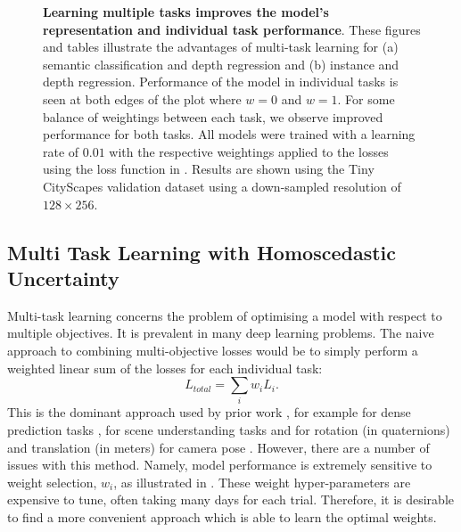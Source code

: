 {\begin{landscape}
\begin{figure}[t]
   \caption[Effect of loss weighting in multi-task learning.]{\textbf{Learning multiple tasks improves the model's representation and individual task performance}. These figures and tables illustrate the advantages of multi-task learning for (a) semantic classification and depth regression and (b) instance and depth regression. Performance of the model in individual tasks is seen at both edges of the plot where $w=0$ and $w=1$. For some balance of weightings between each task, we observe improved performance for both tasks. All models were trained with a learning rate of $0.01$ with the respective weightings applied to the losses using the loss function in . Results are shown using the Tiny CityScapes validation dataset using a down-sampled resolution of $128\times256$.}
\label{fig:scale_factor}
\end{figure}
\end{landscape}
\clearpage%
}


\subsection{Multi Task Learning with Homoscedastic Uncertainty}
\label{sec:multitask}

Multi-task learning concerns the problem of optimising a model with respect to multiple objectives. It is prevalent in many deep learning problems. The naive approach to combining multi-objective losses would be to simply perform a weighted linear sum of the losses for each individual task:
\begin{equation}
\label{eqn:basic_loss}
L_{total}= \sum_i w_i L_{i}.
\end{equation}
This is the dominant approach used by prior work \citep{teichmann2016multinet,sermanet2013overfeat,liao2016understand,uhrig2016pixel}, for example for dense prediction tasks \citep{kokkinos2016ubernet}, for scene understanding tasks \citep{eigen2015predicting} and for rotation (in quaternions) and translation (in meters) for camera pose \citep{kendall2015posenet}. However, there are a number of issues with this method. Namely, model performance is extremely sensitive to weight selection, $w_i$, as illustrated in . These weight hyper-parameters are expensive to tune, often taking many days for each trial. Therefore, it is desirable to find a more convenient approach which is able to learn the optimal weights.

